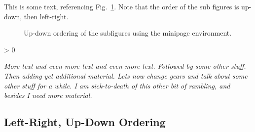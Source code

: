 \documentclass{aiaa}%
\makeatletter
\newlength{\subfigwidth}%
\newlength{\subfigcolsep}%
\newcounter{numrepeat}
\newcommand{\replicate}[2]{\par
 \setcounter{numrepeat}{#1}\relax
 \@whilenum \value{numrepeat} > 0 \do
  {{#2}\addtocounter{numrepeat}{-1}}\par}
\newcommand{\filler}%
  {\em More text and even more text and even more text.
   Followed by some other stuff.
   Then adding yet additional material.
   Lets now change gears and talk about some other stuff for a while.
   I am sick-to-death of this other bit of rambling,
   and besides I need more material.}
\makeatother
\begin{document}
This is some text, referencing Fig.~\ref{fig:3ud3lr}. Note that
the order of the sub figures is up-down, then left-right.
\begin{figure}[htb!]
  \setlength{\subfigwidth}{.333\linewidth}
  \addtolength{\subfigwidth}{-.667\subfigcolsep}
  \vspace*{-\subfigtopskip}
  \begin{minipage}[b]{\subfigwidth}
  \end{minipage}
  \begin{minipage}[b]{\subfigwidth}
    \setcounter{subfigure}{3}
  \end{minipage}
  \begin{minipage}[b]{\subfigwidth}
    \setcounter{subfigure}{6}
  \end{minipage}
  \begin{minipage}[b]{\subfigwidth}
    \setcounter{subfigure}{1}
  \end{minipage}
  \begin{minipage}[b]{\subfigwidth}
    \setcounter{subfigure}{4}
  \end{minipage}
  \begin{minipage}[b]{\subfigwidth}
    \setcounter{subfigure}{7}
  \end{minipage}
  \begin{minipage}[b]{\subfigwidth}
    \setcounter{subfigure}{2}
  \end{minipage}\hfill
  \begin{minipage}[b]{\subfigwidth}
    \setcounter{subfigure}{5}
  \end{minipage}\hfill
  \begin{minipage}[b]{\subfigwidth}
    \setcounter{subfigure}{8}
  \end{minipage}
  \caption{Up-down ordering of the subfigures
           using the minipage environment.}
  \label{fig:3ud3lr}
\end{figure}
\replicate{4}{\filler}

\subsection{Left-Right, Up-Down Ordering}
\end{document}

